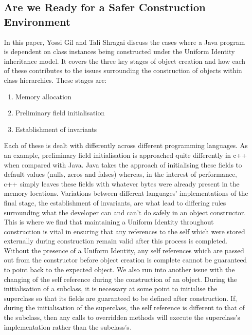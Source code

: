 \subsection{Are we Ready for a Safer Construction Environment~\cite{SaferConstruction}}
In this paper, Yossi Gil and Tali Shragai discuss the cases where a Java program is dependent on class instances being constructed under the Uniform Identity inheritance model. It covers the three key stages of object creation and how each of these contributes to the issues surrounding the construction of objects within class hierarchies. These stages are:
\begin{enumerate}
	\item Memory allocation
	\item Preliminary field initialisation
	\item Establishment of invariants
\end{enumerate}
Each of these is dealt with differently across different programming languages. As an example, preliminary field initialisation is approached quite differently in c++ when compared with Java. Java takes the approach of initialising these fields to default values (nulls, zeros and falses) whereas, in the interest of performance, c++ simply leaves these fields with whatever bytes were already present in the memory locations. \newline
Variations between different languages’ implementations of the final stage, the establishment of invariants, are what lead to differing rules surrounding what the developer can and can’t do safely in an object constructor. This is where we find that maintaining a Uniform Identity throughout construction is vital in ensuring that any references to the self which were stored externally during construction remain valid after this process is completed. Without the presence of a Uniform Identity, any self references which are passed out from the constructor before object creation is complete cannot be guaranteed to point back to the expected object. \newline
We also run into another issue with the changing of the self reference during the construction of an object. During the initialisation of a subclass, it is necessary at some point to initialise the superclass so that its fields are guaranteed to be defined after construction. If, during the initialisation of the superclass, the self reference is different to that of the subclass, then any calls to overridden methods will execute the superclass's implementation rather than the subclass's.

